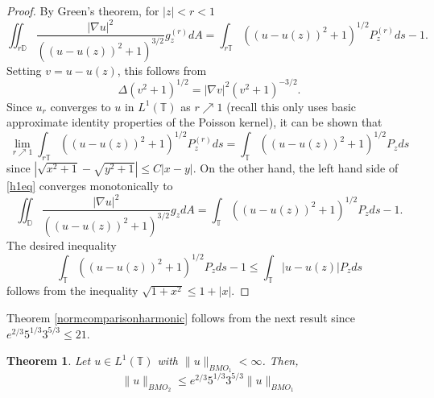 \documentclass[12pt]{amsart}
\newtheorem{theorem}{Theorem}[section]
\theoremstyle{definition}
\theoremstyle{remark}
\numberwithin{equation}{section}
\newcommand{\D}{\mathbb{D}}
\newcommand{\T}{\mathbb{T}}
\begin{document}
\begin{proof}
By Green's theorem, for $|z|<r<1$
\begin{equation} \label{h1eq}
\iint_{r\D} \frac{|\nabla
  u|^2}{((u-u(z))^2+1)^{3/2}} g^{(r)}_z dA = \int_{r\T}((u-u(z))^2+1)^{1/2}P^{(r)}_zds - 1.
\end{equation}
Setting $v = u-u(z)$, this follows from
\[
\Delta (v^2+1)^{1/2} %
=|\nabla v|^2(v^2+1)^{-3/2}.
\]
Since $u_r$ converges to $u$ in $L^1(\T)$ as
$r\nearrow 1$ (recall this only uses basic approximate identity
properties of the Poisson kernel), it can be shown that 
\[
\lim_{r\nearrow 1} \int_{r\T} ((u-u(z))^2+1)^{1/2} P^{(r)}_z ds =
\int_{\T} ((u-u(z))^2+1)^{1/2} P_z ds
\]
since $|\sqrt{x^2+1}-\sqrt{y^2+1}| \leq C|x-y|$. On the other hand,
the left hand side of \eqref{h1eq} converges monotonically to 
\[
\iint_{\D} \frac{|\nabla u|^2}{((u-u(z))^2+1)^{3/2}} g_z dA =
\int_{\T} ((u-u(z))^2+1)^{1/2} P_z ds - 1.
\]
The desired inequality 
\[
\int_{\T} ((u-u(z))^2+1)^{1/2} P_z ds - 1 \leq \int_{\T}|u-u(z)|P_z ds
\]
follows from the inequality $\sqrt{1+x^2} \leq 1+|x|$.
\end{proof}

Theorem \ref{normcomparisonharmonic} follows from the next result
since $e^{2/3}5^{1/3}3^{5/3} \leq 21$.

\begin{theorem} Let $u \in L^1(\T)$ with $\|u\|_{BMO_1} < \infty$. Then,
\[
\|u\|_{BMO_2} \leq e^{2/3}5^{1/3}3^{5/3} \|u\|_{BMO_1}
\]
\end{theorem}
\end{document}
